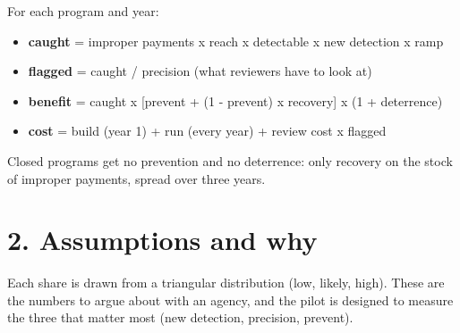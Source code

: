 \documentclass[letterpaper,11pt]{article}
\providecommand{\tightlist}{\setlength{\itemsep}{0pt}\setlength{\parskip}{0pt}}
\begin{document}
For each program and year:

\begin{itemize}
\tightlist
\item
  \textbf{caught} = improper payments x reach x detectable x new
  detection x ramp
\item
  \textbf{flagged} = caught / precision (what reviewers have to look at)
\item
  \textbf{benefit} = caught x {[}prevent + (1 - prevent) x recovery{]} x
  (1 + deterrence)
\item
  \textbf{cost} = build (year 1) + run (every year) + review cost x
  flagged
\end{itemize}

Closed programs get no prevention and no deterrence: only recovery on
the stock of improper payments, spread over three years.

\hypertarget{assumptions-and-why}{%
\section*{2. Assumptions and why}\label{assumptions-and-why}}

Each share is drawn from a triangular distribution (low, likely, high).
These are the numbers to argue about with an agency, and the pilot is
designed to measure the three that matter most (new detection,
precision, prevent).
\end{document}
